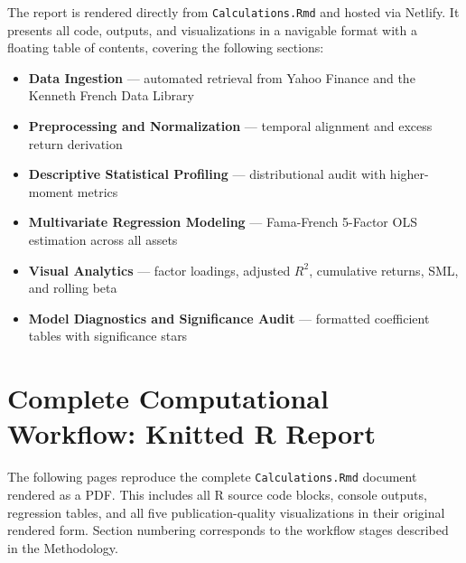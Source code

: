 \documentclass[12pt]{article}
\begin{document}
\vspace{4pt}
The report is rendered directly from \texttt{Calculations.Rmd} and hosted via Netlify. It presents all code, outputs, and visualizations in a navigable format with a floating table of contents, covering the following sections:

\begin{itemize}
    \item \textbf{Data Ingestion} --- automated retrieval from Yahoo Finance and the Kenneth French Data Library
    \item \textbf{Preprocessing and Normalization} --- temporal alignment and excess return derivation
    \item \textbf{Descriptive Statistical Profiling} --- distributional audit with higher-moment metrics
    \item \textbf{Multivariate Regression Modeling} --- Fama-French 5-Factor OLS estimation across all assets
    \item \textbf{Visual Analytics} --- factor loadings, adjusted $R^2$, cumulative returns, SML, and rolling beta
    \item \textbf{Model Diagnostics and Significance Audit} --- formatted coefficient tables with significance stars
\end{itemize}

\newpage
\section{Complete Computational Workflow: Knitted R Report} \label{sec:appendix_calculations}

The following pages reproduce the complete \texttt{Calculations.Rmd} document rendered as a PDF. This includes all R source code blocks, console outputs, regression tables, and all five publication-quality visualizations in their original rendered form. Section numbering corresponds to the workflow stages described in the Methodology.

\vspace{8pt}

\end{document}
